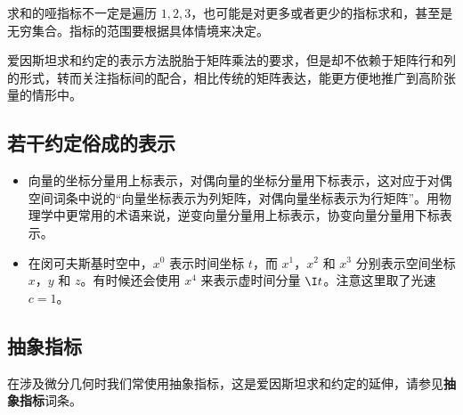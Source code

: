 求和的哑指标不一定是遍历 $1, 2, 3$，也可能是对更多或者更少的指标求和，甚至是无穷集合。指标的范围要根据具体情境来决定。

爱因斯坦求和约定的表示方法脱胎于矩阵乘法的要求，但是却不依赖于矩阵行和列的形式，转而关注指标间的配合，相比传统的矩阵表达，能更方便地推广到高阶张量的情形中。


\subsection{若干约定俗成的表示}
\begin{itemize}
\item 向量的坐标分量用上标表示，对偶向量的坐标分量用下标表示，这对应于对偶空间词条中说的“向量坐标表示为列矩阵，对偶向量坐标表示为行矩阵”。用物理学中更常用的术语来说，逆变向量分量用上标表示，协变向量分量用下标表示。

\item 在闵可夫斯基时空中，$x^0$ 表示时间坐标 $t$，而 $x^1$，$x^2$ 和 $x^3$ 分别表示空间坐标 $x$，$y$ 和 $z$。有时候还会使用 $x^4$ 来表示虚时间分量 $\I t$。注意这里取了光速 $c=1$。




\end{itemize}







\subsection{抽象指标}

在涉及微分几何时我们常使用抽象指标，这是爱因斯坦求和约定的延伸，请参见\textbf{抽象指标}词条。





